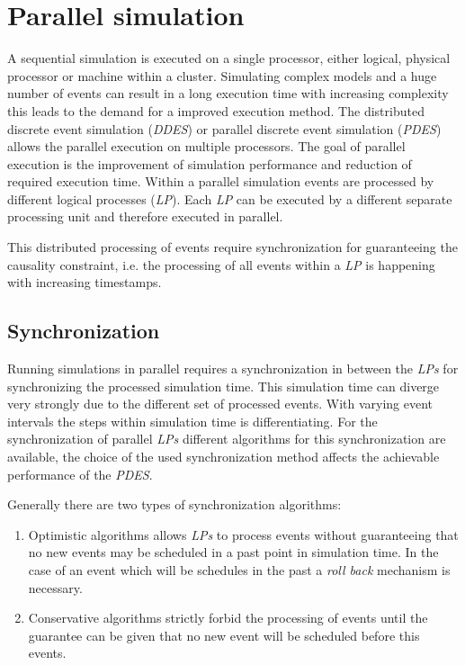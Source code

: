\chapter{Parallel simulation}
\label{cha:parallel_sim}
A sequential simulation is executed on a single processor, either logical, physical processor or machine within a cluster.
Simulating complex models and a huge number of events can result in a long execution time with increasing complexity this leads to the demand for a improved execution method.
The distributed discrete event simulation (\emph{DDES}) or parallel discrete event simulation (\emph{PDES}) allows the parallel execution on multiple processors.
The goal of parallel execution is the improvement of simulation performance and reduction of required execution time.
Within a parallel simulation events are processed by different logical processes (\emph{LP}).
Each \emph{LP} can be executed by a different separate processing unit and therefore executed in parallel. \cite{bagrodia_parsec_1998}

This distributed processing of events require synchronization for guaranteeing the causality constraint, i.e. the processing of all events within a \emph{LP} is happening with increasing timestamps.

\section{Synchronization}
\label{sec:parallel_synchronization}
Running simulations in parallel requires a synchronization in between the \emph{LPs} for synchronizing the processed simulation time.
This simulation time can diverge very strongly due to the different set of processed events.
With varying event intervals the steps within simulation time is differentiating.
For the synchronization of parallel \emph{LPs} different algorithms for this synchronization are available, the choice of the used synchronization method affects the achievable performance of the \emph{PDES}. \cite[chapter 2]{bagrodia_performance_2000}

Generally there are two types of synchronization algorithms:

\begin{enumerate}
    \item Optimistic algorithms allows \emph{LPs} to process events without guaranteeing that no new events may be scheduled in a past point in simulation time.
    In the case of an event which will be schedules in the past a \emph{roll back} mechanism is necessary.
    \item Conservative algorithms strictly forbid the processing of events until the guarantee can be given that no new event will be scheduled before this events.
\end{enumerate}

